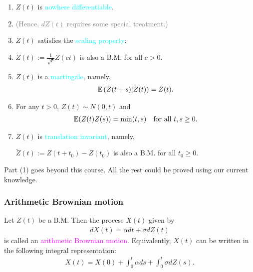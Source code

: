 \begin{frame}[fragile,t]
	\begin{mythm}
		\begin{enumerate}
			\item $Z(t)$ is \textcolor{cyan}{nowhere differentiable}.
			\item[] \textcolor{gray}{(Hence, $dZ(t)$ requires some special treatment.)}
				\bigskip
			\item $Z(t)$ satisfies the \textcolor{cyan}{scaling property}:
			\item[]
				\begin{center}
					$\widetilde{Z}(t):=\frac{1}{\sqrt{c}} Z(ct)$ is also a B.M. for all $c>0$.
				\end{center}

			\item $Z(t)$ is a \textcolor{cyan}{martingale}, namely,
				\begin{align*}
					\mathbb{E}\left(Z(t+s)|Z(t)\right) = Z(t).
				\end{align*}

			\item For any $t>0$,  $Z(t)\sim N(0,t)$ and
				\begin{align*}
					\mathbb{E}(Z(t)Z(s)) = \min(t,s)	\quad \text{for all $t,s\ge 0$}.
				\end{align*}

			\item $Z(t)$ is \textcolor{cyan}{translation invariant}, namely,
				\begin{center}
					$\widetilde{Z}(t):=Z(t+t_0)-Z(t_0)$ is also a B.M. for all $t_0\ge 0$.
				\end{center}
		\end{enumerate}
	\end{mythm}
\end{frame}
\begin{frame}[fragile,t]
\begin{myproof}
	Part (1) goes beyond this course. All the rest could be proved using our current knowledge.
	\vfill

	\myEnd
\end{myproof}
\end{frame}
\begin{frame}[fragile,t]
	\frametitle{Arithmetic Brownian motion}
\begin{mydefinition}
	Let $Z(t)$ be a B.M. Then the process $X(t)$ given by
	 \begin{align*}
		 dX(t) = \alpha dt+ \sigma d Z(t)
	\end{align*}
	is called an \textcolor{magenta}{arithmetic Brownian motion}. Equivalently, $X(t)$ can be written
	in the following integral representation:
\begin{align*}
	X(t) = X(0) + \int_0^t \alpha ds + \int_0^t \sigma dZ(s).
\end{align*}
\end{mydefinition}
\end{frame}
